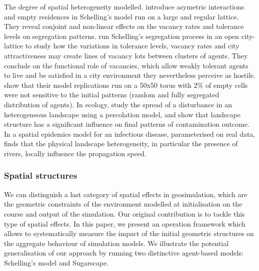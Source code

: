 \documentclass{JASSS}
\begin{document}
\begin{itemize*}
\item The degree of spatial heterogeneity modelled. \citet{StaufferSolomon2007} introduce asymetric interactions and empty residences in Schelling's model run on a large and regular lattice. They reveal conjoint and non-linear effects on the vacancy rates and tolerance levels on segregation patterns. \citet{Gauvinetal2010} run Schelling's segregation process in an open city-lattice to study how the variations in tolerance levels, vacancy rates and city attractiveness may create lines of vacancy lots between clusters of agents. They conclude on the functional role of vacancies, which allow weakly tolerant agents to live and be satisfied in a city environment they nevertheless perceive as hostile. \citet{HatnaBenenson2012} show that their model replications run on a 50x50 torus with 2\% of empty cells were not sensitive to the initial patterns (random and fully segregated distribution of agents). In ecology, \citet{smith2002predicting} study the spread of a disturbance in an heterogeneous landscape using a percolation model, and show that landscape structure has a significant influence on final patterns of contamination outcome. In a spatial epidemics model for an infectious disease, parameterised on real data, \citet{smith2002predicting} finds that the physical landscape heterogeneity, in particular the presence of rivers, locally influence the propagation speed.
\end{itemize*}

\subsubsection{Spatial structures}
We can distinguish a last category of spatial effects in geosimulation, which are the geometric constraints of the environment modelled at initialisation on the course and output of the simulation. Our original contribution is to tackle this type of spatial effects. In this paper, we present an operation framework which allows to systematically measure the impact of the initial geometric structures on the aggregate behaviour of simulation models. We illustrate the potential generalisation of our approach by running two distinctive agent-based models: Schelling's model and Sugarscape.

 
\end{document}
